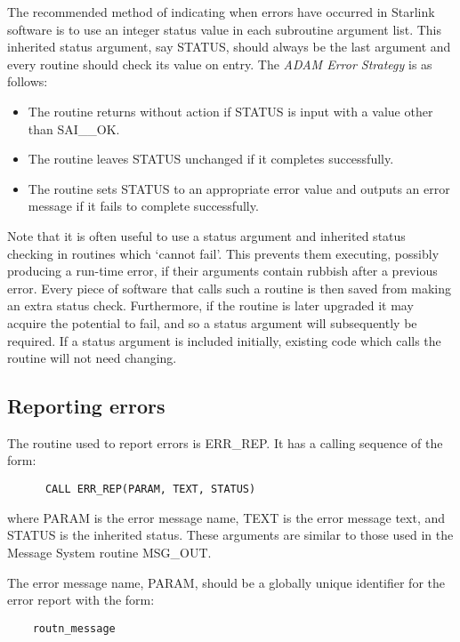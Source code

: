 The recommended method of indicating when errors have occurred in Starlink
software is to use an integer status value in each subroutine argument list. 
This inherited status argument, say STATUS, should always be the last argument
and every routine should check its value on entry. 
The {\em ADAM Error Strategy} is as follows:
\begin {itemize}
\item The routine returns without action if STATUS is input with a value
 other than SAI\_\_OK. 
\item The routine leaves STATUS unchanged if it completes successfully.
\item The routine sets STATUS to an appropriate error value and outputs an
 error message if it fails to complete successfully. 
\end {itemize}
Note that it is often useful to use a status argument and inherited status
checking in routines which `cannot fail'. 
This prevents them executing, possibly producing a run-time error, if their
arguments contain rubbish after a previous error.
Every piece of software that calls such a routine is then saved from making
an extra status check. 
Furthermore, if the routine is later upgraded it may acquire the potential
to fail, and so a status argument will subsequently be required.
If a status argument is included initially, existing code which calls 
the routine will not need changing.

\subsection {Reporting errors}

The routine used to report errors is ERR\_REP. 
It has a calling sequence of the form:

\begin{small}
\begin{verbatim}
      CALL ERR_REP(PARAM, TEXT, STATUS)
\end{verbatim}
\end{small}

where PARAM is the error message name, TEXT is the error message text, and
STATUS is the inherited status.
These arguments are similar to those used in the Message System routine
MSG\_OUT. 

The error message name, PARAM, should be a globally unique identifier for the
error report with the form:

\begin{small}
\begin{verbatim}
    routn_message
\end{verbatim}
\end{small}


